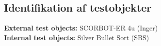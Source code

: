 \documentclass[Main.tex]{subfiles}
\begin{document}
\subsection{Identifikation af testobjekter}

\textbf{External test objects:} SCORBOT-ER 4u (Inger)
\\
\textbf{Internal test objects:} Silver Bullet Sort (SBS)
\end{document}
